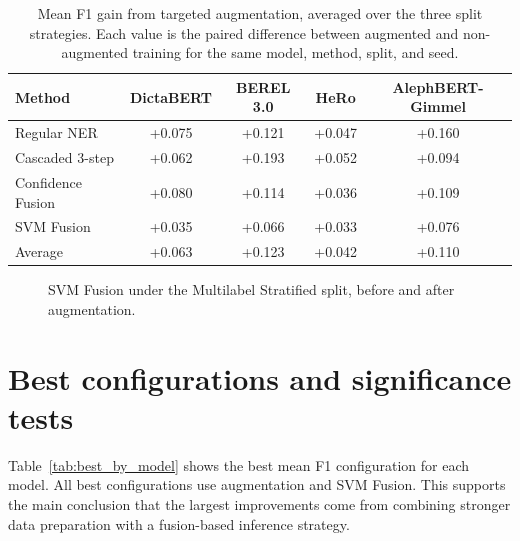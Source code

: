 \documentclass[12pt,a4paper]{report}
\begin{document}
\begin{table}[htbp]
\centering
\small
\caption{Mean F1 gain from targeted augmentation, averaged over the three split strategies. Each value is the paired difference between augmented and non-augmented training for the same model, method, split, and seed.}
\label{tab:augmentation_delta}
\begin{tabular}{lcccc}
\toprule
Method & DictaBERT & BEREL 3.0 & HeRo & AlephBERT-Gimmel \\
\midrule
Regular NER & +0.075 & +0.121 & +0.047 & +0.160 \\
Cascaded 3-step & +0.062 & +0.193 & +0.052 & +0.094 \\
Confidence Fusion & +0.080 & +0.114 & +0.036 & +0.109 \\
SVM Fusion & +0.035 & +0.066 & +0.033 & +0.076 \\
\midrule
Average & +0.063 & +0.123 & +0.042 & +0.110 \\
\bottomrule
\end{tabular}
\end{table}

\begin{figure}[htbp]
\centering
{}
\caption{SVM Fusion under the Multilabel Stratified split, before and after augmentation.}
\label{fig:svm_multilabel_aug}
\end{figure}

\section{Best configurations and significance tests}
Table~\ref{tab:best_by_model} shows the best mean F1 configuration for each model. All best configurations use augmentation and SVM Fusion. This supports the main conclusion that the largest improvements come from combining stronger data preparation with a fusion-based inference strategy.
\end{document}
